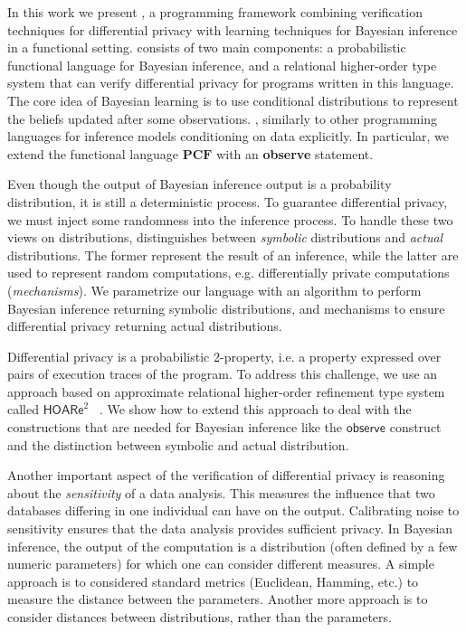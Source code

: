 \documentclass{sig-alternate-05-2015}
\theoremstyle{plain}
\theoremstyle{definition}
\theoremstyle{corollary}
\def\pcf{\ensuremath{\mathbf{PCF}}\xspace}
\begin{document}
In this work we present \THESYSTEM, a programming framework combining
verification techniques for differential privacy with learning techniques for
Bayesian inference in a functional setting. \THESYSTEM consists of two main
components: a probabilistic functional language for Bayesian inference, and a
relational higher-order type system that can verify differential privacy for
programs written in this language.  The core idea of Bayesian learning is to use
conditional distributions to represent the beliefs updated after some
observations. \THESYSTEM, similarly to other programming languages for inference
models conditioning on data explicitly. In particular, we extend the functional
language \pcf with an \textbf{observe} statement.

Even though the output of Bayesian inference output is a probability
distribution, it is still a deterministic process. To guarantee differential
privacy, we must inject some randomness into the inference process.  To handle
these two views on distributions, \THESYSTEM distinguishes between
\emph{symbolic} distributions and \emph{actual} distributions. The former
represent the result of an inference, while the latter are used to represent
random computations, e.g.  differentially private computations
(\emph{mechanisms}). We parametrize our language with an algorithm to perform
Bayesian inference returning symbolic distributions, and mechanisms to ensure
differential privacy returning actual distributions. 

Differential privacy is a probabilistic 2-property, i.e. a property expressed
over pairs of execution traces of the program. To address this challenge, we
use an approach based on approximate relational higher-order refinement type
system called $\mathsf{HOARe}^2$ ~\citep{BartheGAHRS15}. We show how to extend
this approach to deal with the constructions that are needed for Bayesian
inference like the $\mathsf{observe}$ construct and the distinction between
symbolic and actual distribution. 

Another important aspect of the verification of differential privacy is
reasoning about the \emph{sensitivity} of a data analysis. This measures the
influence that two databases differing in one individual can have on the output.
Calibrating noise to sensitivity ensures that the data analysis provides
sufficient privacy. In Bayesian inference, the output of the computation is a
distribution (often defined by a few numeric parameters) for which one can
consider different measures. A simple approach is to  considered standard
metrics (Euclidean, Hamming, etc.) to measure the distance between the
parameters. Another more approach is to consider distances
between distributions, rather than the parameters. 
\end{document}
